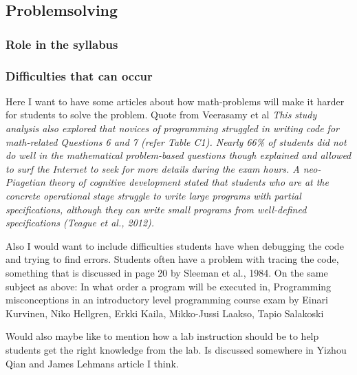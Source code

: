 \subsection{Problemsolving}

\subsubsection{Role in the syllabus}

\subsubsection{Difficulties that can occur}


Here I want to have some articles about how math-problems will make it harder for students to solve the problem. Quote from Veerasamy et al \emph{This study analysis also explored that novices of programming struggled in writing code for math-related Questions 6 and 7 (refer Table C1). Nearly 66\% of students did not do well in the mathematical problem-based questions though explained and allowed to surf the Internet to seek for more details during the exam hours. A neo-Piagetian theory of cognitive development stated that students who are at the concrete operational stage struggle to write large programs with partial specifications, although they can write small programs from well-defined specifications (Teague et al., 2012).}

Also I would want to include difficulties students have when debugging the code and trying to find errors. Students often have a problem with tracing the code, something that is discussed in page 20 by Sleeman et al., 1984. 
On the same subject as above: In what order a program will be executed in, Programming misconceptions in an introductory level programming course exam by Einari Kurvinen, Niko Hellgren, Erkki Kaila, Mikko-Jussi Laakso, Tapio Salakoski

Would also maybe like to mention how a lab instruction should be to help students get the right knowledge from the lab. Is discussed somewhere in Yizhou Qian and James Lehmans article I think.

